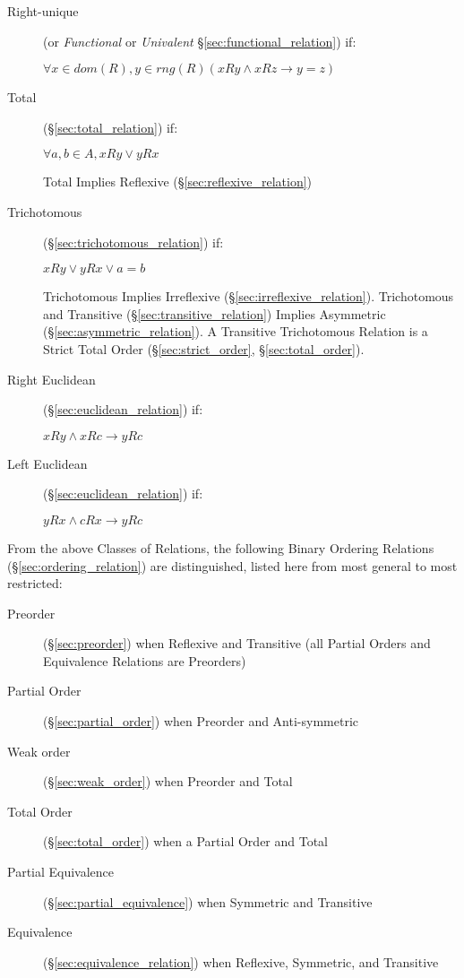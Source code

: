 \begin{description}
\item[Right-unique] (or \emph{Functional} or \emph{Univalent}
  \S\ref{sec:functional_relation}) if:

  $ \forall x \in dom(R), y \in rng(R)
    (xRy \wedge xRz \rightarrow y = z) $

\item[Total] (\S\ref{sec:total_relation}) if:

  $ \forall a,b \in A, xRy \vee yRx $

  Total Implies Reflexive (\S\ref{sec:reflexive_relation})

\item[Trichotomous] (\S\ref{sec:trichotomous_relation}) if:

  $ xRy \vee yRx \vee a = b $

  Trichotomous Implies Irreflexive (\S\ref{sec:irreflexive_relation}).
  Trichotomous and Transitive (\S\ref{sec:transitive_relation})
  Implies Asymmetric (\S\ref{sec:asymmetric_relation}). A Transitive
  Trichotomous Relation is a Strict Total Order
  (\S\ref{sec:strict_order}, \S\ref{sec:total_order}).

\item[Right Euclidean] (\S\ref{sec:euclidean_relation}) if:

  $ xRy \wedge xRc \rightarrow yRc $

\item[Left Euclidean] (\S\ref{sec:euclidean_relation}) if:

  $ yRx \wedge cRx \rightarrow yRc $

\end{description}

From the above Classes of Relations, the following Binary Ordering
Relations (\S\ref{sec:ordering_relation}) are distinguished, listed
here from most general to most restricted:

\begin{description}
\item[Preorder] (\S\ref{sec:preorder}) when Reflexive and Transitive
  (all Partial Orders and Equivalence Relations are Preorders)
\item[Partial Order] (\S\ref{sec:partial_order}) when Preorder and
  Anti-symmetric
\item[Weak order] (\S\ref{sec:weak_order}) when Preorder and Total
\item[Total Order] (\S\ref{sec:total_order}) when a Partial Order and
  Total
\item[Partial Equivalence] (\S\ref{sec:partial_equivalence}) when
  Symmetric and Transitive
\item[Equivalence] (\S\ref{sec:equivalence_relation}) when Reflexive,
  Symmetric, and Transitive
\end{description}

